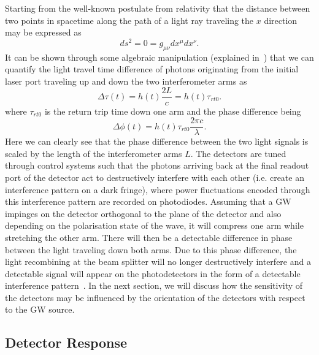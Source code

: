 Starting from the well-known postulate from relativity that the distance between
two points in spacetime along the path of a light ray traveling 
the $x$ direction may be expressed as
\begin{equation}
    ds^2 = 0 = g_{\mu\nu}dx^{\mu}dx^{\nu}.
\end{equation}
It can be shown through some algebraic manipulation 
(explained in~\cite{SAULSON2013288})
that we can quantify the light travel time difference of photons 
originating from the initial laser port traveling up and down 
the two interferometer arms as 
%
\begin{equation}
    \Delta \tau(t) = h(t) \frac{2L}{c} = h(t) \tau_{rt0}.
\end{equation}
%
where $\tau_{rt0}$ is the return trip time down 
one arm and the phase difference being 
%
\begin{equation}
    \Delta \phi(t) = h(t) \tau_{rt0} \frac{2\pi c}{\lambda}.
\end{equation}
%
Here we can clearly see that the phase difference 
between the two light signals is scaled by the 
length of the interferometer arms $L$. The 
detectors are tuned through control systems such that the photons arriving 
back at the final readout port of the detector act to destructively 
interfere with each other (i.e. create an interference pattern on a dark fringe), where power fluctuations encoded through this interference pattern are recorded on photodiodes. Assuming that a \ac{GW} 
impinges on the detector orthogonal to the plane of the detector and also 
depending on the polarisation state of the wave, 
it will compress one arm 
while stretching the other arm. There will then be a 
detectable difference in phase between the light traveling 
down both arms. Due to this phase difference, the 
light recombining at the beam splitter will no longer 
destructively interfere and a detectable signal will appear 
on the photodetectors in the form of a detectable interference 
pattern~\cite{PhysRevD.95.062003}. In the next section, we will 
discuss how the sensitivity of the detectors may be influenced 
by the orientation of the detectors with respect 
to the \ac{GW} source.

\subsection{Detector Response}

